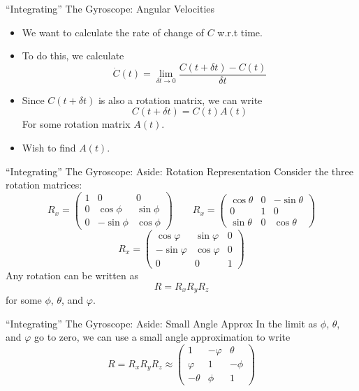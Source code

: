 \documentclass[10pt]{beamer}
\begin{document}
\begin{frame}{``Integrating'' The Gyroscope: Angular Velocities}
  \begin{itemize}
  \item We want to calculate the rate of change of \(C\) w.r.t time.
  \item To do this, we calculate
    \[\dot{C}(t) = \lim_{\delta t \to 0}\frac{C(t + \delta t) - C(t)}{\delta t}\]
  \item Since \(C(t + \delta t)\) is also a rotation matrix, we can write
    \[C(t + \delta t) = C(t)A(t)\]
    For some rotation matrix \(A(t)\).
  \item Wish to find \(A(t)\).
  \end{itemize}
\end{frame}

\begin{frame}{``Integrating'' The Gyroscope: Aside: Rotation Representation}
  Consider the three rotation matrices:
  \[R_x =
    \begin{pmatrix}
      1 & 0 & 0\\ 0 & \cos \phi & \sin\phi\\0 & -\sin\phi & \cos\phi
    \end{pmatrix}\qquad
    R_x =
    \begin{pmatrix}
      \cos\theta & 0 & -\sin\theta\\ 0 & 1 & 0\\\sin\theta & 0 & \cos\theta
    \end{pmatrix}
  \]
  \[
    R_x =
    \begin{pmatrix}
      \cos\varphi & \sin\varphi & 0\\
      -\sin\varphi & \cos\varphi & 0\\
      0 & 0 & 1
    \end{pmatrix}
  \]
  Any rotation can be written as
  \[R = R_xR_yR_z\]
  for some \(\phi\), \(\theta\), and \(\varphi\).
\end{frame}

\begin{frame}{``Integrating'' The Gyroscope: Aside: Small Angle Approx}
  In the limit as \(\phi\), \(\theta\), and \(\varphi\) go to zero, we can use a small angle approximation to write
  \[R = R_xR_yR_z \approx
    \begin{pmatrix}
      1 & -\varphi & \theta\\
      \varphi & 1 & -\phi\\
      -\theta & \phi & 1
    \end{pmatrix}
  \]
\end{frame}
\end{document}
